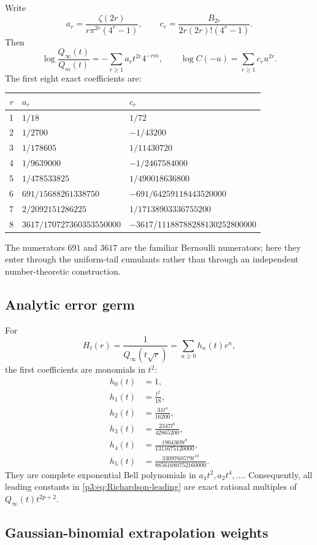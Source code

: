 \documentclass[11pt,oneside]{article}
\numberwithin{equation}{section}
\theoremstyle{definition}
\theoremstyle{remark}
\begin{document}
Write
\[
 a_r=\frac{\zeta(2r)}{r\pi^{2r}(4^r-1)},
 \qquad
 c_r=\frac{B_{2r}}{2r(2r)!(4^r-1)}.
\]
Then
\[
 \log\frac{Q_\infty(t)}{Q_m(t)}=-\sum_{r\ge1}a_rt^{2r}4^{-rm},
 \qquad
 \log C(-u)=\sum_{r\ge1}c_ru^{2r}.
\]
The first eight exact coefficients are:
\begin{center}
\small
\begin{tabular}{@{}rll@{}}
\toprule
$r$ & $a_r$ & $c_r$\\
\midrule
1 & $1/18$ & $1/72$\\
2 & $1/2700$ & $-1/43200$\\
3 & $1/178605$ & $1/11430720$\\
4 & $1/9639000$ & $-1/2467584000$\\
5 & $1/478533825$ & $1/490018636800$\\
6 & $691/15688261338750$ & $-691/64259118443520000$\\
7 & $2/2092151286225$ & $1/17138903336755200$\\
8 & $3617/170727360353550000$ & $-3617/11188788288130252800000$\\
\bottomrule
\end{tabular}
\end{center}
The numerators $691$ and $3617$ are the familiar Bernoulli numerators; here they enter through
the uniform-tail cumulants rather than through an independent number-theoretic construction.

\subsection{Analytic error germ}

For
\[
 H_t(r)=\frac1{Q_\infty(t\sqrt r)}=\sum_{n\ge0}h_n(t)r^n,
\]
the first coefficients are monomials in $t^2$:
\begin{align*}
 h_0(t)&=1,\\
 h_1(t)&=\frac{t^2}{18},\\
 h_2(t)&=\frac{31t^4}{16200},\\
 h_3(t)&=\frac{2347t^6}{42865200},\\
 h_4(t)&=\frac{1904369t^8}{1311675120000},\\
 h_5(t)&=\frac{3309760579t^{10}}{88561680752160000}.
\end{align*}
They are complete exponential Bell polynomials in $a_1t^2,a_2t^4,\ldots$.  Consequently,
all leading constants in \eqref{p3:eq:Richardson-leading} are exact rational multiples of
$Q_\infty(t)t^{2p+2}$.

\subsection{Gaussian-binomial extrapolation weights}
\end{document}
